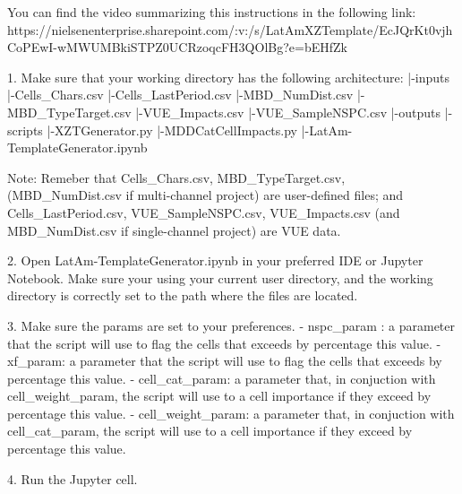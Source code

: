 You can find the video summarizing this instructions in the following link:
https://nielsenenterprise.sharepoint.com/:v:/s/LatAmXZTemplate/EcJQrKt0vjhCoPEwI-wMWUMBkiSTPZ0UCRzoqcFH3QOlBg?e=bEHfZk

1. Make sure that your working directory has the following architecture:
    |-inputs
        |-Cells_Chars.csv
        |-Cells_LastPeriod.csv
        |-MBD_NumDist.csv
        |-MBD_TypeTarget.csv
        |-VUE_Impacts.csv
        |-VUE_SampleNSPC.csv
    |-outputs
    |-scripts
        |-XZTGenerator.py
        |-MDDCatCellImpacts.py 
        |-LatAm-TemplateGenerator.ipynb

    Note: Remeber that Cells_Chars.csv, MBD_TypeTarget.csv, (MBD_NumDist.csv 
            if multi-channel project) are user-defined files; and 
            Cells_LastPeriod.csv, VUE_SampleNSPC.csv, VUE_Impacts.csv (and 
            MBD_NumDist.csv if single-channel project) are VUE data.


2. Open LatAm-TemplateGenerator.ipynb in your preferred IDE or Jupyter Notebook.
    Make sure your using your current user directory, and the working directory
    is correctly set to the path where the files are located.


3. Make sure the params are set to your preferences.
    - nspc_param :       a parameter that the script will use to flag the cells that
                            exceeds by percentage this value.
    - xf_param:          a parameter that the script will use to flag the cells that
                            exceeds by percentage this value.
    - cell_cat_param:    a parameter that, in conjuction with cell_weight_param, 
                            the script will use to a cell importance if they exceed 
                            by percentage this value.
    - cell_weight_param: a parameter that, in conjuction with cell_cat_param, 
                            the script will use to a cell importance if they exceed 
                            by percentage this value.


4. Run the Jupyter cell.